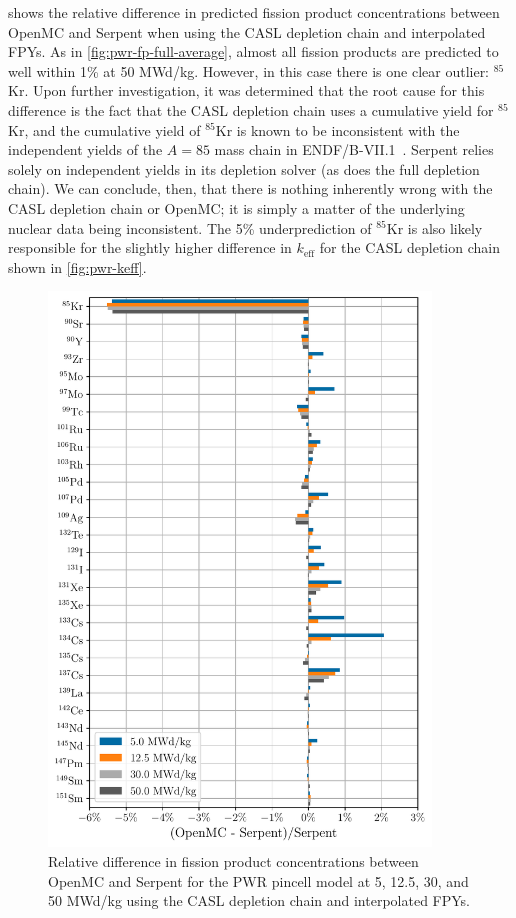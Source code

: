 \documentclass[3p,authoryear]{elsarticle}
\begin{document}
 shows the relative difference in predicted
fission product concentrations between OpenMC and Serpent when using the CASL
depletion chain and interpolated FPYs. As in \cref{fig:pwr-fp-full-average},
almost all fission products are predicted to well within 1\% at 50 MWd/kg.
However, in this case there is one clear outlier: $^{85}$Kr. Upon further
investigation, it was determined that the root cause for this difference is the
fact that the CASL depletion chain uses a cumulative yield for $^{85}$Kr, and
the cumulative yield of $^{85}$Kr is known to be inconsistent with the
independent yields of the $A=85$ mass chain in
ENDF/B-VII.1~\citep{pigni2015nds}. Serpent relies solely on independent yields
in its depletion solver (as does the full depletion chain). We can conclude,
then, that there is nothing inherently wrong with the CASL depletion chain or
OpenMC; it is simply a matter of the underlying nuclear data being inconsistent.
The 5\% underprediction of $^{85}$Kr is also likely responsible for the slightly
higher difference in $k_\text{eff}$ for the CASL depletion chain shown in
\cref{fig:pwr-keff}.
\begin{figure}[H]
  \centering
  \includegraphics[width=4in]{figures/pwr_fp_casl_average.pdf}
  \caption{Relative difference in fission product concentrations between OpenMC
  and Serpent for the PWR pincell model at 5, 12.5, 30, and 50 MWd/kg using the
  CASL depletion chain and interpolated FPYs.}
  \label{fig:pwr-fp-casl-average}
\end{figure}
\end{document}
